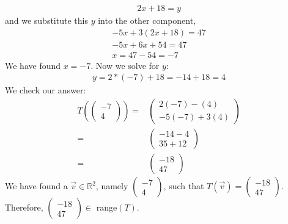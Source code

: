 \documentclass[12pt]{article}
\newenvironment{problem}[2][Problem]
{
	\begin{trivlist} 
		\item[\hskip \labelsep {\bfseries #1 #2:}]
	}
{
	\end{trivlist}
	}
\newenvironment{solution}[1][Solution]
{
	\begin{trivlist} 
		\item[\hskip \labelsep {\itshape #1:}]
	}
	{
	\end{trivlist}
}
\begin{document}
\begin{problem}{4}
\begin{solution}
\begin{align*}
2x+18 =y
\end{align*}
and we substitute this $y$ into the other component,
\begin{align*}
-5x + 3 (2x +18) = 47\\
-5x + 6x + 54 =47\\
x = 47-54 =-7
\end{align*}
We have found $x=-7$. Now we solve for $y$:
\begin{align*}
y= 2*(-7) +18 = -14 +18 = 4
\end{align*}
We check our answer:
\begin{align*}
T\left(\begin{pmatrix} -7 \\ 4\end{pmatrix} \right)=&\begin{pmatrix} 2(-7)-(4) \\ -5(-7)+3(4)\end{pmatrix}\\
=& \begin{pmatrix} -14-4 \\ 35+12\end{pmatrix}\\
=&\begin{pmatrix} -18 \\ 47\end{pmatrix}
\end{align*}
We have found a $\vec{v} \in \mathbb{R}^2$, namely $\begin{pmatrix} -7 \\ 4\end{pmatrix}$, such that $T(\vec{v}) = \begin{pmatrix} -18 \\ 47\end{pmatrix}$. Therefore, $\begin{pmatrix} -18 \\ 47\end{pmatrix} \in$ range$(T)$.
\end{solution}
\end{problem}
\end{document}
